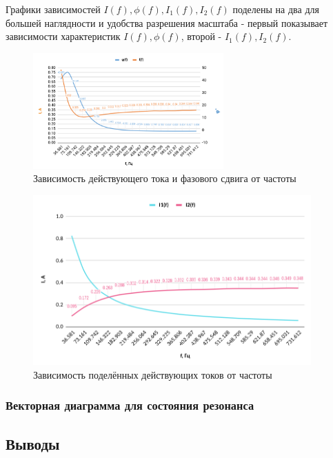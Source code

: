 Графики зависимостей $I(f), \phi(f), I_1 (f), I_2 (f)$ поделены на два для большей наглядности и удобства разрешения масштаба - первый показывает зависимости характеристик $I(f), \phi(f)$, второй - $I_1 (f), I_2 (f)$.

\begin{figure}[H]
	\centering
	\includegraphics[width=0.65\textwidth]{./data/graph_part2_3.png}
	\caption{Зависимость действующего тока и фазового сдвига от частоты}
\end{figure}

\begin{figure}[H]
	\centering
	\includegraphics[width=0.95\textwidth]{./data/graph_part2_4.png}
	\caption{Зависимость поделённых действующих токов от частоты}
\end{figure}


\subsubsection{Векторная диаграмма для состояния резонанса}



\subsection{Выводы}
